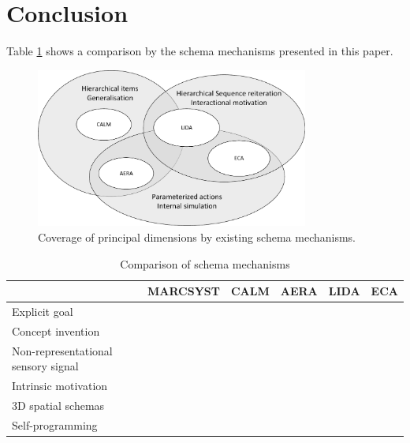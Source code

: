 \documentclass[runningheads]{llncs}
\begin{document}

\section{Conclusion}

Table \ref{tab:comp} shows a comparison by the schema mechanisms presented in this paper.


\begin{figure}
	\centering
	\includegraphics[width=0.8\textwidth]{Figure_venn.pdf}
	\caption{Coverage of principal dimensions by existing schema mechanisms.} 
	\label{fig:venn}
\end{figure}



\begin{table}
	\centering
	\caption{Comparison of schema mechanisms}\label{tab:comp}
	\begin{tabular}{|l|c|c|c|c|c|}
		\hline
		&  MARCSYST & CALM & AERA & LIDA & ECA \\
		\hline
		Explicit goal & \checkmark & \checkmark & \checkmark & \checkmark &  \\
		Concept invention & \checkmark & \checkmark &  &  &  \\
		Non-representational sensory signal &  &  &  & \checkmark & \checkmark \\
		Intrinsic motivation &    &  &  & \checkmark & \checkmark \\
		3D spatial schemas &    &  &  & \checkmark & \checkmark \\
		Self-programming &    &  & &  & \checkmark \\
		\hline
	\end{tabular}
\end{table}
\end{document}
